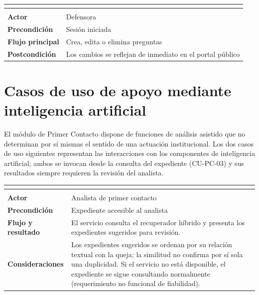 \begingroup
{}
\small
\renewcommand{\arraystretch}{1.25}
\setlength{\tabcolsep}{4pt}
\begin{longtable}{|L{3.2cm}|L{12.4cm}|}
	\hline
	 \\
	\hline
	\endfirsthead
	\hline
	 \\
	\hline
	\endhead
	\textbf{Actor} & Defensora \\ \hline
	\textbf{Precondición} & Sesión iniciada \\ \hline
	\textbf{Flujo principal} & Crea, edita o elimina preguntas \\ \hline
	\textbf{Postcondición} & Los cambios se reflejan de inmediato en el portal público \\ \hline
\end{longtable}
\endgroup

\section{Casos de uso de apoyo mediante inteligencia artificial}
El módulo de Primer Contacto dispone de funciones de análisis asistido que no determinan por sí mismas el sentido de una actuación institucional. Los dos casos de uso siguientes representan las interacciones con los componentes de inteligencia artificial; ambos se invocan desde la consulta del expediente (CU-PC-03) y sus resultados siempre requieren la revisión del analista.

\begingroup
{}
\small
\renewcommand{\arraystretch}{1.25}
\setlength{\tabcolsep}{4pt}
\begin{longtable}{|L{3.2cm}|L{12.4cm}|}
	\hline
	 \\
	\hline
	\endfirsthead
	\hline
	 \\
	\hline
	\endhead
	\textbf{Actor} & Analista de primer contacto \\ \hline
	\textbf{Precondición} & Expediente accesible al analista \\ \hline
	\textbf{Flujo y resultado} & El servicio consulta el recuperador híbrido y presenta los expedientes sugeridos para revisión. \\ \hline
	\textbf{Consideraciones} & Los expedientes sugeridos se ordenan por su relación textual con la queja; la similitud no confirma por sí sola una duplicidad. Si el servicio no está disponible, el expediente se sigue consultando normalmente (requerimiento no funcional de fiabilidad). \\ \hline
\end{longtable}
\endgroup


